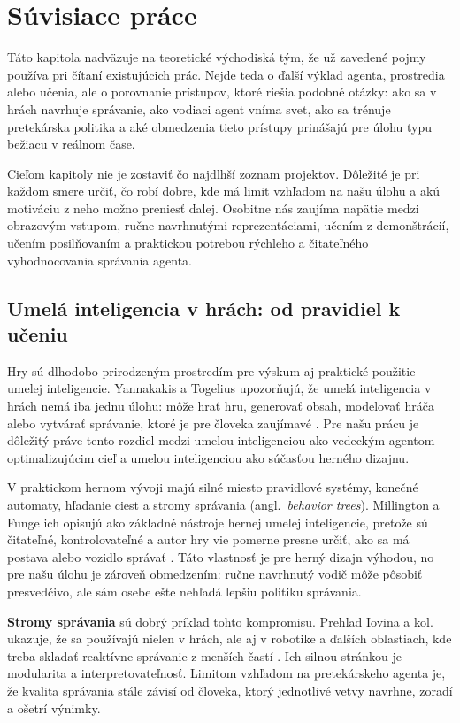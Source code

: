 \chapter{Súvisiace práce}

Táto kapitola nadväzuje na teoretické východiská tým, že už zavedené pojmy používa pri čítaní existujúcich prác. Nejde teda o ďalší výklad agenta, prostredia alebo učenia, ale o porovnanie prístupov, ktoré riešia podobné otázky: ako sa v hrách navrhuje správanie, ako vodiaci agent vníma svet, ako sa trénuje pretekárska politika a aké obmedzenia tieto prístupy prinášajú pre úlohu typu \Trackmania{} bežiacu v reálnom čase.

Cieľom kapitoly nie je zostaviť čo najdlhší zoznam projektov. Dôležité je pri každom smere určiť, čo robí dobre, kde má limit vzhľadom na našu úlohu a akú motiváciu z neho možno preniesť ďalej. Osobitne nás zaujíma napätie medzi obrazovým vstupom, ručne navrhnutými reprezentáciami, učením z demonštrácií, učením posilňovaním a praktickou potrebou rýchleho a čitateľného vyhodnocovania správania agenta.

\section{Umelá inteligencia v hrách: od pravidiel k učeniu}

Hry sú dlhodobo prirodzeným prostredím pre výskum aj praktické použitie umelej inteligencie. Yannakakis a Togelius upozorňujú, že umelá inteligencia v hrách nemá iba jednu úlohu: môže hrať hru, generovať obsah, modelovať hráča alebo vytvárať správanie, ktoré je pre človeka zaujímavé \cite{yannakakis_togelius2018aigames}. Pre našu prácu je dôležitý práve tento rozdiel medzi umelou inteligenciou ako vedeckým agentom optimalizujúcim cieľ a umelou inteligenciou ako súčasťou herného dizajnu.

V praktickom hernom vývoji majú silné miesto pravidlové systémy, konečné automaty, hľadanie ciest a stromy správania (angl.~\emph{behavior trees}). Millington a Funge ich opisujú ako základné nástroje hernej umelej inteligencie, pretože sú čitateľné, kontrolovateľné a autor hry vie pomerne presne určiť, ako sa má postava alebo vozidlo správať \cite{millington_funge2019ai_for_games}. Táto vlastnosť je pre herný dizajn výhodou, no pre našu úlohu je zároveň obmedzením: ručne navrhnutý vodič môže pôsobiť presvedčivo, ale sám osebe ešte nehľadá lepšiu politiku správania.

\textbf{Stromy správania} sú dobrý príklad tohto kompromisu. Prehľad Iovina a kol. ukazuje, že sa používajú nielen v hrách, ale aj v robotike a ďalších oblastiach, kde treba skladať reaktívne správanie z menších častí \cite{iovino2022behavior_trees}. Ich silnou stránkou je modularita a interpretovateľnosť. Limitom vzhľadom na pretekárskeho agenta je, že kvalita správania stále závisí od človeka, ktorý jednotlivé vetvy navrhne, zoradí a ošetrí výnimky.

